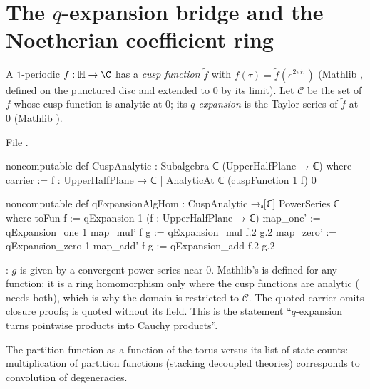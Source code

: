 \section{The \texorpdfstring{$q$}{q}-expansion bridge and the Noetherian coefficient ring}\label{l14:sec:qexp}

\begin{definition}\label{l14:def:cuspAnalytic}
A $1$-periodic $f:\lfourteenH\to\C$ has a \emph{cusp function} $\tilde f$ with $f(\tau) = \tilde f(e^{2\pi i\tau})$ (Mathlib
, defined on the punctured disc and extended to $0$ by its limit). Let $\mathcal C$ be the set of $f$
whose cusp function is analytic at $0$; its \emph{$q$-expansion} is the Taylor series of $\tilde f$ at $0$ (Mathlib
).
\end{definition}
\noindent File .
\begin{leancode}
noncomputable def CuspAnalytic : Subalgebra ℂ (UpperHalfPlane → ℂ) where
  carrier := {f : UpperHalfPlane → ℂ | AnalyticAt ℂ (cuspFunction 1 f) 0}

noncomputable def qExpansionAlgHom : CuspAnalytic →ₐ[ℂ] PowerSeries ℂ where
  toFun f := qExpansion 1 (f : UpperHalfPlane → ℂ)
  map_one' := qExpansion_one 1
  map_mul' f g := qExpansion_mul f.2 g.2
  map_zero' := qExpansion_zero 1
  map_add' f g := qExpansion_add f.2 g.2
\end{leancode}
\begin{dictionary}
: $g$ is given by a convergent power series near $0$. Mathlib's  is defined for any
function; it is a ring homomorphism only where the cusp functions are analytic ( needs both), which is why
the domain is restricted to $\mathcal C$. The quoted carrier omits closure proofs;  is quoted without
its  field. This is the statement ``$q$-expansion turns pointwise products into Cauchy products''.
\end{dictionary}
\begin{physics}
The partition function as a function of the torus versus its list of state counts: multiplication of partition functions
(stacking decoupled theories) corresponds to convolution of degeneracies.
\end{physics}

